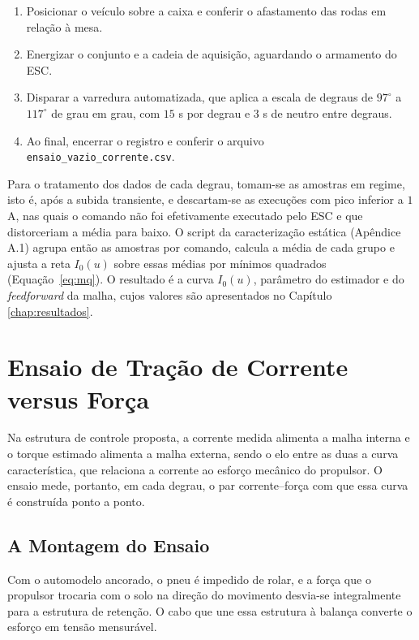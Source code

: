\begin{enumerate}
    \item Posicionar o veículo sobre a caixa e conferir o afastamento das rodas em
    relação à mesa.
    \item Energizar o conjunto e a cadeia de aquisição, aguardando o armamento do ESC.
    \item Disparar a varredura automatizada, que aplica a escala de degraus de $97^\circ$
    a $117^\circ$ de grau em grau, com $15$ s por degrau e $3$ s de neutro entre degraus.
    \item Ao final, encerrar o registro e conferir o arquivo \texttt{ensaio\_vazio\_corrente.csv}.
\end{enumerate}

Para o tratamento dos dados de cada degrau, tomam-se as amostras em regime, isto é, após a subida
transiente, e descartam-se as execuções com pico inferior a $1$ A, nas quais o comando não
foi efetivamente executado pelo ESC e que distorceriam a média para baixo. O script da
caracterização estática (Apêndice A.1) agrupa então as amostras por comando, calcula a
média de cada grupo e ajusta a reta $I_0(u)$ sobre essas médias por mínimos quadrados
(Equação~\eqref{eq:mq}). O resultado é a curva $I_0(u)$, parâmetro do estimador e do
\emph{feedforward} da malha, cujos valores são apresentados no Capítulo
\ref{chap:resultados}.

\section{Ensaio de Tração de Corrente versus Força}
\label{sec:tracao}
Na estrutura de controle proposta, a corrente medida alimenta a malha interna e o torque
estimado alimenta a malha externa, sendo o elo entre as duas a curva característica, que
relaciona a corrente ao esforço mecânico do propulsor. O ensaio mede, portanto, em cada
degrau, o par corrente--força com que essa curva é construída ponto a ponto.

\subsection{A Montagem do Ensaio}
\label{sec:montagem}

Com o automodelo ancorado, o pneu é impedido de rolar, e a força que o propulsor
trocaria com o solo na direção do movimento desvia-se integralmente para a estrutura de
retenção. O cabo que une essa estrutura à balança converte o esforço em tensão mensurável.

